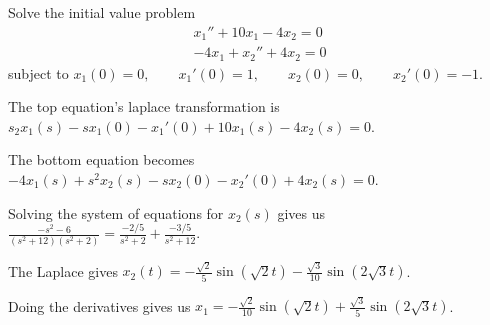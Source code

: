 \documentclass[../diffeq.tex]{subfiles}
\begin{document}
\begin{example}
    Solve the initial value problem 
    \begin{align*}
        x_1''+10x_1-4x_2=0\\
        -4x_1+x_2''+4x_2=0
    \end{align*}
    subject to $x_1(0)=0, \qquad x_1'(0)=1, \qquad x_2(0)=0, \qquad x_2'(0)=-1$.

    The top equation's laplace transformation is $s_2x_1(s)-sx_1(0)-x_1'(0)+10x_1(s)-4x_2(s)=0$.

    The bottom equation becomes $-4x_1(s)+s^2x_2(s)-sx_2(0)-x_2'(0)+4x_2(s)=0$.

    Solving the system of equations for $x_2(s)$ gives us $\frac{-s^2-6}{(s^2+12)(s^2+2)}=\frac{-2/5}{s^2+2}+\frac{-3/5}{s^2+12}$.

    The Laplace gives $x_2(t)=-\frac{\sqrt{2}}{5}\sin(\sqrt{2}t)-\frac{\sqrt{3}}{10}\sin(2\sqrt{3}t)$.

    Doing the derivatives gives us $x_1=-\frac{\sqrt{2}}{10}\sin(\sqrt{2}t)+\frac{\sqrt{3}}{5}\sin(2\sqrt{3}t)$.
\end{example}
\end{document}
